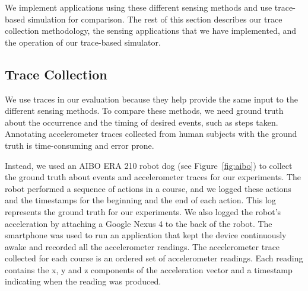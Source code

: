We implement applications using these different sensing methods and use trace-based simulation for comparison. The rest of this section describes our trace collection methodology, the sensing applications that we have implemented, and the operation of our trace-based simulator.


\subsection{Trace Collection}

We use traces in our evaluation because they help provide the same
input to the different sensing methods. To compare these methods, we
need ground truth about the occurrence and the timing of desired
events, such as steps taken. Annotating accelerometer traces collected
from human subjects with the ground truth is time-consuming and error
prone.

Instead, we used an AIBO ERA 210 robot dog (see Figure~\ref{fig:aibo})
to collect the ground truth about events and accelerometer traces for
our experiments. The robot performed a sequence of actions in a
course, and we logged these actions and the timestamps for the
beginning and the end of each action. This log represents the ground
truth for our experiments. We also logged the robot's acceleration by 
attaching a Google Nexus 4 to the back of the robot. The smartphone was 
used to run an application that kept the device continuously awake and 
recorded all the accelerometer readings. The accelerometer trace collected 
for each course is an ordered set of
accelerometer readings. Each reading contains the x, y and z
components of the acceleration vector and a timestamp indicating when
the reading was produced.

